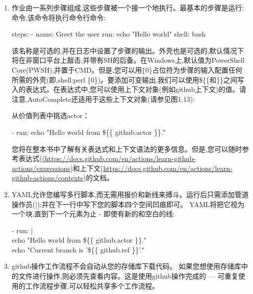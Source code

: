 \begin{enumerate}
\item 
作业由一系列步骤组成,这些步骤被一个接一个地执行。最基本的步骤是运行:命令,该命令将执行命令行命令:

\begin{shell}
steps:
  - name: Greet the user
    run: echo "Hello world"
    shell: bash
\end{shell}

该名称是可选的,并在日志中设置了步骤的输出。外壳也是可选的,默认情况下将在非窗口平台上敲击,并带有SH的后备。在Windows上,默认值为PowerShell Core(PWSH),并置于CMD。但是,您可以用\{0\}占位符为步骤的输入配置任何所需的外壳(即,shell:perl \{0\})。要添加可变输出,我们可以使用\$\{\{和\}\}之间写入的表达式。在表达式中,您可以使用上下文对象(例如github上下文)的值。请注意,AutoComplete还适用于这些上下文对象(请参见图1.13):


从价值列表中挑选actor：

\begin{tcolorbox}[ breakable,colback = bashcodebg, colframe= black!50!white]
\scriptsize{
- run: echo "Hello world  from \$\{\{ github.actor \}\}."
}
\end{tcolorbox}

您将在整本书中了解有关表达式和上下文语法的更多信息。但是,您可以随时参考表达式(\url{(https://docs.github.com/en/actions/learn-github-actions/expressions})和上下文(\url{https://docs.github.com/en/actions/learn-github-actions/contexts})的文档。

\item 
YAML允许您编写多行脚本,而无需用报价和新线来搏斗。运行后只需添加管道操作员(|):并在下一行中写下您的脚本四个空间凹痕即可。 YAML将把它视为一个块,直到下一个元素为止 - 即使有新的和空白的线:

\begin{tcolorbox}[ breakable,colback = bashcodebg, colframe= black!50!white]
\scriptsize{
- run: | \\
\hspace*{2em}echo "Hello world  from \$\{\{ github.actor \}\}." \\
\hspace*{2em}echo "Current branch is '\$\{\{ github.ref \}\}'."
}
\end{tcolorbox}

\item 
github操作工作流程不会自动从您的存储库下载代码。 如果您想使用存储库中的文件进行操作,则必须先查看内容。这是使用github操作完成的  ---  可重复使用的工作流程步骤,可以轻松共享多个工作流程。


\end{enumerate}
